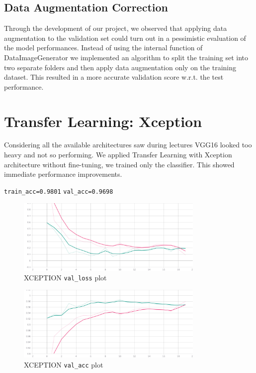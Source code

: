 \documentclass{article}
\begin{document}
		\subsection{Data Augmentation Correction}
			Through the development of our project, we observed that applying data augmentation to the validation set could turn out in a pessimistic evaluation of the model performances. Instead of using the internal function of DataImageGenerator we implemented an algorithm to split the training set into two separate folders and then apply data augmentation only on the training dataset. This resulted in a more accurate validation score w.r.t. the test performance.
			
	\section{Transfer Learning: Xception}
		Considering all the available architectures saw during lectures VGG16 looked too heavy and not so performing. We applied Transfer Learning with Xception architecture without fine-tuning, we trained only the classifier. This showed immediate performance improvements.
		
		\texttt{train\_acc=0.9801}
		\texttt{val\_acc=0.9698}
		
		\begin{figure}[H]
			\centering
			\includegraphics[width=9cm, keepaspectratio]{XCEPTION_LOSS.jpg}
			\caption{XCEPTION \texttt{val\_loss} plot}
		\end{figure}
	
		\begin{figure}[H]
			\centering
			\includegraphics[width=9cm, keepaspectratio]{XCEPTION_ACC.jpg}
			\caption{XCEPTION \texttt{val\_acc} plot}
		\end{figure}
		
\end{document}
